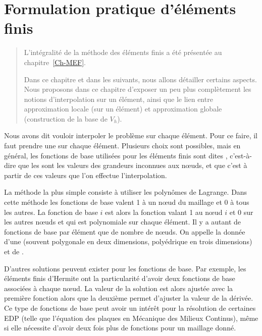 \chapter{Formulation pratique d'éléments finis}\label{Ch-Elts}
\begin{abstract}
L'intégralité de la méthode des éléments finis a été présentée au chapitre~\ref{Ch-MEF}.

Dans ce chapitre et dans les suivants, nous allons détailler certains aspects.
Nous proposons dans ce chapitre d'exposer un peu plus complètement les notions
d'interpolation sur un élément, ainsi que le lien entre approximation locale
(sur un élément) et approximation globale (construction de la base de $V_h$).
\end{abstract}


Nous avons dit vouloir interpoler le problème sur chaque élément.
Pour ce faire, il faut prendre une  sur chaque élément.
Plusieurs choix sont possibles, mais en général, les fonctions de base utilisées pour les
éléments finis sont dites , c'est-à-dire que les
 sont les valeurs des grandeurs inconnues aux nœuds,
et que c'est à partir de ces valeurs que l'on effectue l'interpolation.

\medskip
La méthode la plus simple consiste à utiliser les polynômes de Lagrange.
Dans cette méthode les fonctions de base valent 1 à un nœud du maillage et 0 à tous les autres.
La fonction de base $i$ est alors la fonction valant 1 au nœud $i$ et 0 sur les autres nœuds
et qui est polynomiale sur chaque élément.
Il y a autant de fonctions de base par élément que de nombre de nœuds.
On appelle  la donnée d'une 
(souvent polygonale en deux dimensions, polyédrique en trois dimensions) et de .

\medskip
D'autres solutions peuvent exister pour les fonctions de base.
Par exemple, les éléments finis d'Hermite
ont la particularité d'avoir deux fonctions de base associées à chaque nœud.
La valeur de la solution est alors ajustée avec la première fonction alors que la deuxième
permet d'ajuster la valeur de la dérivée.
Ce type de fonctions de base peut avoir un intérêt pour la résolution de certaines EDP
(telle que l'équation des plaques en Mécanique des Milieux Continus), même si elle nécessite d'avoir deux fois plus
de fonctions pour un maillage donné.








